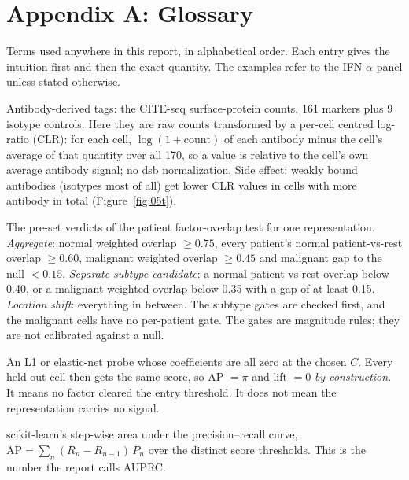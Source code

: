 \section*{Appendix A: Glossary}
{}
\label{app:glossary}

Terms used anywhere in this report, in alphabetical order. Each entry gives the intuition first and then the exact quantity. The examples refer to the IFN-$\alpha$ panel unless stated otherwise.

\begin{description}[leftmargin=0pt,itemsep=3pt,font=\normalfont\bfseries]

\item[ADT (CLR).] Antibody-derived tags: the CITE-seq surface-protein counts, 161 markers plus 9 isotype controls. Here they are raw counts transformed by a per-cell centred log-ratio (CLR): for each cell, $\log(1+\text{count})$ of each antibody minus the cell's average of that quantity over all 170, so a value is relative to the cell's own average antibody signal; no dsb normalization. Side effect: weakly bound antibodies (isotypes most of all) get lower CLR values in cells with more antibody in total (Figure~\ref{fig:05t}).

\item[Aggregation calls (aggregate, location shift, separate-subtype candidate).] The pre-set verdicts of the patient factor-overlap test for one representation. \emph{Aggregate}: normal weighted overlap $\geq 0.75$, every patient's normal patient-vs-rest overlap $\geq 0.60$, malignant weighted overlap $\geq 0.45$ and malignant gap to the null $<0.15$. \emph{Separate-subtype candidate}: a normal patient-vs-rest overlap below 0.40, or a malignant weighted overlap below 0.35 with a gap of at least 0.15. \emph{Location shift}: everything in between. The subtype gates are checked first, and the malignant cells have no per-patient gate. The gates are magnitude rules; they are not calibrated against a null.

\item[All-zero probe.] An L1 or elastic-net probe whose coefficients are all zero at the chosen $C$. Every held-out cell then gets the same score, so AP $=\pi$ and lift $=0$ \emph{by construction}. It means no factor cleared the entry threshold. It does not mean the representation carries no signal.

\item[AP (average precision).] scikit-learn's step-wise area under the precision--recall curve, $\mathrm{AP}=\sum_n (R_n-R_{n-1})\,P_n$ over the distinct score thresholds. This is the number the report calls AUPRC.


\end{description}

